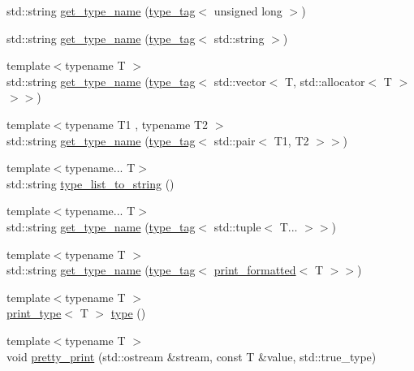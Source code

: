\begin{DoxyCompactItemize}
\item 
std\+::string \hyperlink{namespacedbg_a5316d9f58e72c20cfbb14496326d89f1}{get\+\_\+type\+\_\+name} (\hyperlink{structdbg_1_1type__tag}{type\+\_\+tag}$<$ unsigned long $>$)
\item 
std\+::string \hyperlink{namespacedbg_a3bcf58cf4aba1da7a34e79b0fb2ce036}{get\+\_\+type\+\_\+name} (\hyperlink{structdbg_1_1type__tag}{type\+\_\+tag}$<$ std\+::string $>$)
\item 
{\footnotesize template$<$typename T $>$ }\\std\+::string \hyperlink{namespacedbg_a09680fe23089b62fd2879bd1f38897a6}{get\+\_\+type\+\_\+name} (\hyperlink{structdbg_1_1type__tag}{type\+\_\+tag}$<$ std\+::vector$<$ T, std\+::allocator$<$ T $>$$>$$>$)
\item 
{\footnotesize template$<$typename T1 , typename T2 $>$ }\\std\+::string \hyperlink{namespacedbg_aa4daf4ad755b0a3b4206debc162f064d}{get\+\_\+type\+\_\+name} (\hyperlink{structdbg_1_1type__tag}{type\+\_\+tag}$<$ std\+::pair$<$ T1, T2 $>$$>$)
\item 
{\footnotesize template$<$typename... T$>$ }\\std\+::string \hyperlink{namespacedbg_aef0097e53230ee373eaabc4981048cac}{type\+\_\+list\+\_\+to\+\_\+string} ()
\item 
{\footnotesize template$<$typename... T$>$ }\\std\+::string \hyperlink{namespacedbg_a1d187f8063d8c8c024e57a7985bcac78}{get\+\_\+type\+\_\+name} (\hyperlink{structdbg_1_1type__tag}{type\+\_\+tag}$<$ std\+::tuple$<$ T... $>$$>$)
\item 
{\footnotesize template$<$typename T $>$ }\\std\+::string \hyperlink{namespacedbg_a6224c816a1c695160e869f427854d569}{get\+\_\+type\+\_\+name} (\hyperlink{structdbg_1_1type__tag}{type\+\_\+tag}$<$ \hyperlink{structdbg_1_1print__formatted}{print\+\_\+formatted}$<$ T $>$$>$)
\item 
{\footnotesize template$<$typename T $>$ }\\\hyperlink{structdbg_1_1print__type}{print\+\_\+type}$<$ T $>$ \hyperlink{namespacedbg_a2365d80e3a3525e6025040383ff8661b}{type} ()
\item 
{\footnotesize template$<$typename T $>$ }\\void \hyperlink{namespacedbg_a4ba5b016ce65b09fef3935a945310904}{pretty\+\_\+print} (std\+::ostream \&stream, const T \&value, std\+::true\+\_\+type)
\item 
$$
\end{DoxyCompactItemize}
